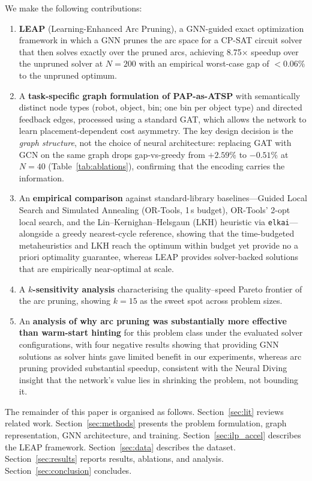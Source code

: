 \documentclass[review,times]{elsarticle}
\begin{document}
We make the following contributions:
\begin{enumerate}
    \item \textbf{LEAP} (Learning-Enhanced Arc Pruning), a GNN-guided exact optimization framework in which a GNN prunes the arc space for a CP-SAT circuit solver that then solves exactly over the pruned arcs, achieving 8.75$\times$ speedup over the unpruned solver at $N{=}200$ with an empirical worst-case gap of $<$0.06\% to the unpruned optimum.
    \item A \textbf{task-specific graph formulation of PAP-as-ATSP} with semantically distinct node types (robot, object, bin; one bin per object type) and directed feedback edges, processed using a standard GAT, which allows the network to learn placement-dependent cost asymmetry. The key design decision is the \emph{graph structure}, not the choice of neural architecture: replacing GAT with GCN on the same graph drops gap-vs-greedy from $+2.59\%$ to $-0.51\%$ at $N{=}40$ (Table~\ref{tab:ablations}), confirming that the encoding carries the information.
    \item An \textbf{empirical comparison} against standard-library baselines---Guided Local Search and Simulated Annealing (OR-Tools, 1\,s budget), OR-Tools' 2-opt local search, and the Lin--Kernighan--Helsgaun (LKH) heuristic via \texttt{elkai}---alongside a greedy nearest-cycle reference, showing that the time-budgeted metaheuristics and LKH reach the optimum within budget yet provide no a priori optimality guarantee, whereas LEAP provides solver-backed solutions that are empirically near-optimal at scale.
    \item A \textbf{$k$-sensitivity analysis} characterising the quality--speed Pareto frontier of the arc pruning, showing $k{=}15$ as the sweet spot across problem sizes.
    \item An \textbf{analysis of why arc pruning was substantially more effective than warm-start hinting} for this problem class under the evaluated solver configurations, with four negative results showing that providing GNN solutions as solver hints gave limited benefit in our experiments, whereas arc pruning provided substantial speedup, consistent with the Neural Diving insight \cite{nair2021neural} that the network's value lies in shrinking the problem, not bounding it.
\end{enumerate}

The remainder of this paper is organised as follows. Section~\ref{sec:lit} reviews related work. Section~\ref{sec:methods} presents the problem formulation, graph representation, GNN architecture, and training. Section~\ref{sec:ilp_accel} describes the LEAP framework. Section~\ref{sec:data} describes the dataset. Section~\ref{sec:results} reports results, ablations, and analysis. Section~\ref{sec:conclusion} concludes.
\end{document}
